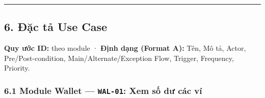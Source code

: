 \documentclass[11pt,a4paper]{article}
\begin{document}
\begin{center}\rule{1.0\linewidth}{0.5pt}\end{center}

\newpage

\subsection{6. Đặc tả Use Case}\label{ux111ux1eb7c-tux1ea3-use-case}

\textbf{Quy ước ID:} theo module · \textbf{Định dạng (Format A):} Tên,
Mô tả, Actor, Pre/Post-condition, Main/Alternate/Exception Flow,
Trigger, Frequency, Priority.

\subsubsection{\texorpdfstring{6.1 Module Wallet --- \texttt{WAL-01}: Xem số dư các ví}{6.1 Module Wallet --- WAL-01: Xem số dư các ví}}\label{module-wallet-wal-01-xem-sux1ed1-dux1b0-cuxe1c-vuxed}
\end{document}
